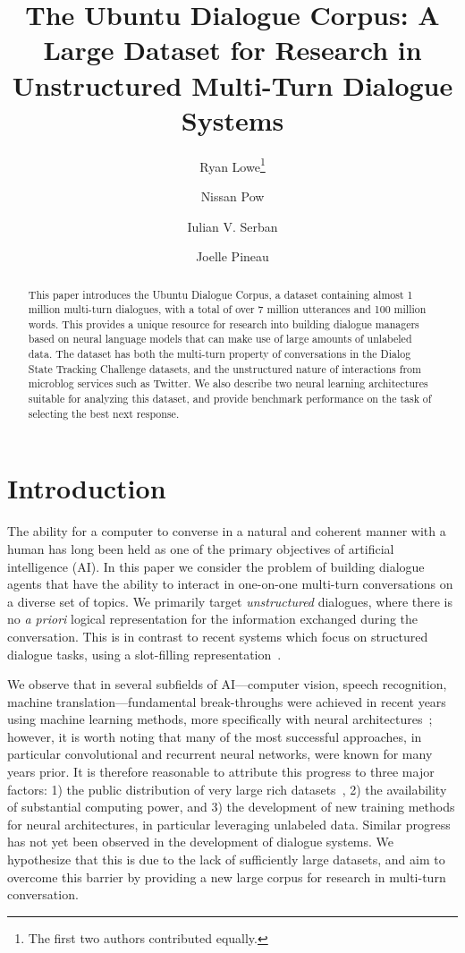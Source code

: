 \documentclass[11pt,a4paper]{article}
\title{The Ubuntu Dialogue Corpus: A Large Dataset for Research in Unstructured Multi-Turn Dialogue Systems}
\author[*]{Ryan Lowe\thanks{ The first two authors contributed equally.}}
\author[*]{Nissan Pow}
\author[]{Iulian V. Serban}
\author[*]{Joelle Pineau}
\affil[*]{School of Computer Science, McGill University, Montreal, Canada}
\affil[]{Department of Computer Science and Operations Research, Universi{\'e} de Montr{\'e}al, Montreal, Canada}
\begin{document}
\maketitle

\begin{abstract}
This paper introduces the Ubuntu Dialogue Corpus, a dataset containing almost 1 million multi-turn dialogues, with a total of over 7 million utterances and 100 million words. This provides a unique resource for research into building dialogue managers based on neural language models that can make use of large amounts of unlabeled data.  The dataset has both the multi-turn property of conversations in the Dialog State Tracking Challenge datasets, and the unstructured nature of interactions from microblog services such as Twitter. We also describe two neural learning architectures suitable for analyzing this dataset, and provide benchmark performance on the task of selecting the best next response.
\end{abstract}

\section{Introduction}

The ability for a computer to converse in a natural and coherent manner with a human has long been held as one of the primary objectives of artificial intelligence (AI). In this paper we consider the problem of building dialogue agents that have the ability to interact in one-on-one multi-turn conversations on a diverse set of topics. We primarily target \emph{unstructured} dialogues, where there is no \emph{a priori} logical representation for the information exchanged during the conversation.  This is in contrast to recent systems which focus on structured dialogue tasks, using a slot-filling representation~\cite{williams2013dialog,henderson2014second,singh02}.

We observe that in several subfields of AI---computer vision, speech recognition, machine translation---fundamental break-throughs were achieved in recent years using machine learning methods, more specifically with neural architectures~\cite{bengio2013representation}; however, it is worth noting that many of the most successful approaches, in particular convolutional and recurrent neural networks, were known for many years prior. It is therefore reasonable to attribute this progress to three major factors:  1) the public distribution of very large rich datasets~\cite{deng2009imagenet}, 2) the availability of substantial computing power, and 3) the development of new training methods for neural architectures, in particular leveraging unlabeled data.  Similar progress has not yet been observed in the development of dialogue systems. We hypothesize that this is due to the lack of sufficiently large datasets, and aim to overcome this barrier by providing a new large corpus for research in multi-turn conversation.
\end{document}
